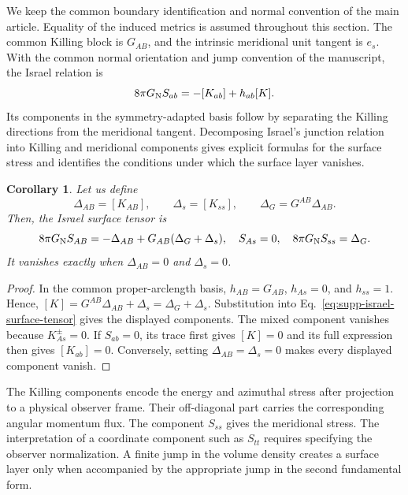 \documentclass[11pt,a4paper]{article}
\numberwithin{equation}{section}
\theoremstyle{plain}
\newtheorem{corollary}{Corollary}
\theoremstyle{definition}
\theoremstyle{remark}
\begin{document}
We keep the common boundary identification and normal convention of the
main article. Equality of the induced metrics is assumed throughout this
section. The common Killing block is $G_{AB}$, and the intrinsic meridional unit tangent is $e_s$. With the common normal orientation and jump convention of the manuscript, the Israel relation is
\begin{equation}\label{eq:supp-israel-surface-tensor}
8\pi G_{\rm N}S_{ab}=-[K_{ab}]+h_{ab}[K].
\end{equation}
Its components in the symmetry-adapted basis follow by separating the Killing directions from the meridional tangent. Decomposing Israel’s junction relation into Killing and meridional components gives explicit formulas for the surface stress and identifies the conditions under which the surface layer vanishes.
\begin{corollary}\label{cor:symmetry-adapted-shell-tensor}
Let us define
\begin{equation}\label{eq:shell-defect-data}
\Delta_{AB}=[K_{AB}],\qquad
\Delta_s=[K_{ss}],\qquad
\Delta_G=G^{AB}\Delta_{AB}.
\end{equation}
Then, the Israel surface tensor is
\begin{equation}
8\pi G_{\rm N}S_{AB}=-\Delta_{AB}+G_{AB}(\Delta_G+\Delta_s),\quad
S_{As}=0,\quad
8\pi G_{\rm N}S_{ss}=\Delta_G.
\end{equation}
It vanishes exactly when $\Delta_{AB}=0$ and $\Delta_s=0$.
\end{corollary}
\begin{proof}
In the common proper-arclength basis, $h_{AB}=G_{AB}$, $h_{As}=0$, and
$h_{ss}=1$. Hence, $[K]=G^{AB}\Delta_{AB}+\Delta_s=\Delta_G+\Delta_s$.
Substitution into Eq.~\eqref{eq:supp-israel-surface-tensor}
gives the displayed components. The mixed component vanishes because
$K_{As}^\pm=0$. If $S_{ab}=0$, its trace first gives $[K]=0$ and its
full expression then gives $[K_{ab}]=0$. Conversely, setting $\Delta_{AB}=\Delta_s=0$ makes every displayed component vanish.
\end{proof}
The Killing components encode the energy and azimuthal stress after
projection to a physical observer frame. Their off-diagonal part carries
the corresponding angular momentum flux. The component $S_{ss}$ gives the
meridional stress. The interpretation of a coordinate component such as
$S_{tt}$ requires specifying the observer normalization. A finite jump in
the volume density creates a surface layer only when accompanied by the
appropriate jump in the second fundamental form.
\end{document}
